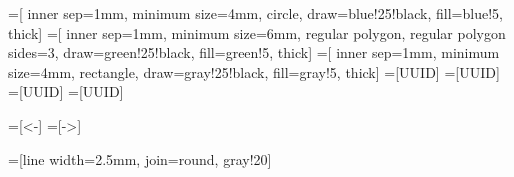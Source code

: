 \usepackage{tikz}
\usetikzlibrary{arrows, shapes, backgrounds}

=[
    inner sep=1mm, minimum size=4mm, circle,
    draw=blue!25!black, fill=blue!5, thick]
=[
    inner sep=1mm, minimum size=6mm, regular polygon, regular polygon sides=3,
    draw=green!25!black, fill=green!5, thick]
=[
    inner sep=1mm, minimum size=4mm, rectangle,
    draw=gray!25!black, fill=gray!5, thick]
=[UUID]
=[UUID]
=[UUID]
=[UUID]

=[<-]
=[->]

=[line width=2.5mm, join=round, gray!20]
